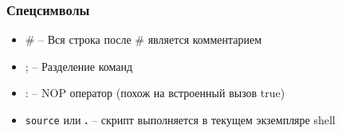 \begin{frame}
	\frametitle{Спецсимволы}

	\begin{itemize}
		\item \# -- Вся строка после \# является комментарием
		\item ; -- Разделение команд
		\item : -- NOP оператор (похож на встроенный вызов true)
		\item {\tt source} или {\bf .} -- скрипт выполняется в текущем экземпляре shell
	\end{itemize}

\end{frame}
